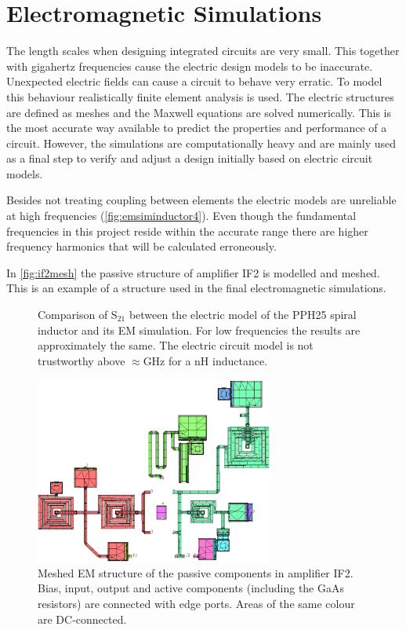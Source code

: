 \chapter{Electromagnetic Simulations}\label{app:emsim}
		The length scales when designing integrated circuits are very small. This together with gigahertz frequencies cause the electric design models to be inaccurate. Unexpected electric fields can cause a circuit to behave very erratic. To model this behaviour realistically finite element analysis is used. The electric structures are defined as meshes and the Maxwell equations are solved numerically. This is the most accurate way available to predict the properties and performance of a circuit. However, the simulations are computationally heavy and are mainly used as a final step to verify and adjust a design initially based on electric circuit models.

		Besides not treating coupling between elements the electric models are unreliable at high frequencies (\autoref{fig:emsiminductor4}). Even though the fundamental frequencies in this project reside within the accurate range there are higher frequency harmonics that will be calculated erroneously.
		
		In \autoref{fig:if2mesh} the passive structure of amplifier IF2 is modelled and meshed. This is an example of a structure used in the final electromagnetic simulations.

		\begin{figure}[hpt!]
			\centering
			\caption[EM simulation of the UMS PPH25 spiral inductor.]{Comparison of S$_{21}$ between the electric model of the PPH25 spiral inductor and its EM simulation. For low frequencies the results are approximately the same. The electric circuit model is not trustworthy above $\approx$\unit[12]{GHz} for a \unit[4]{nH} inductance.}\label{fig:emsiminductor4}
		\end{figure}

		\begin{figure}[hpt!]
			\centering
			\includegraphics[width=0.7\textwidth]{fig/emsim/if2mesh}
			\caption[EM mesh of amplifier IF2.]{Meshed EM structure of the passive components in amplifier IF2. Bias, input, output and active components (including the GaAs resistors) are connected with edge ports. Areas of the same colour are DC-connected.}\label{fig:if2mesh}
		\end{figure}